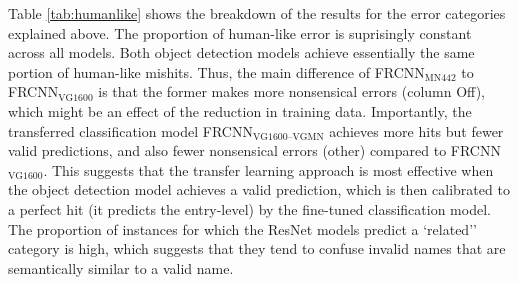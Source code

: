 Table \ref{tab:humanlike} shows the breakdown of the results for the error categories explained above. The proportion of human-like error is suprisingly constant across all models.
Both object detection models achieve essentially the same portion of human-like mishits. Thus, the main difference of FRCNN$_{\text{MN442}}$ to  FRCNN$_{\text{VG1600}}$ is that the former makes more nonsensical errors (column Off), which might be an effect of the reduction in training data.
Importantly, the transferred classification model FRCNN$_{\text{VG1600--VGMN}}$ achieves more hits but fewer valid predictions, and also fewer nonsensical errors (other) compared to FRCNN$_{\text{VG1600}}$.
This suggests that the transfer learning approach is most effective when the object detection model achieves a valid prediction, which is then calibrated to a perfect hit (it predicts the entry-level) by the fine-tuned classification model.
The proportion of instances for which the ResNet models predict a `related'' category is high, which suggests that they tend to confuse invalid names that are semantically similar to a valid name. 

%     
%

